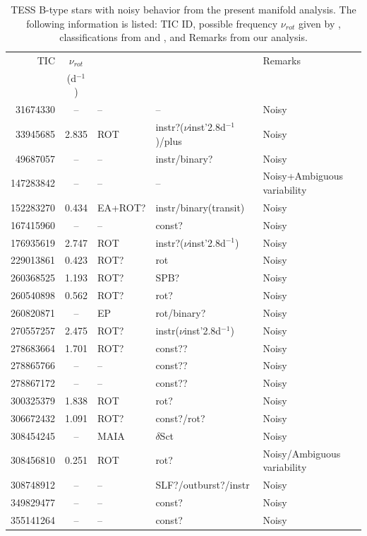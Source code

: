 \documentclass[RNAAS]{aastex63}
\begin{document}
\begin{table}[h]
    \centering
   \caption{\label{TABLE 3} TESS B-type stars with noisy behavior from the present manifold analysis. The following information is listed: TIC ID, possible frequency $\nu_{rot}$ given by \citet{Balona2019}, classifications from \citet{Balona2019} and \citet{Pedersen2019}, and Remarks from our analysis.}
    \begin{tabular}{rclll}
        \hline \hline
TIC	&	$\nu_{rot}$	&\cite{Balona2019} &	\citet{Pedersen2019}&	Remarks	\\
	&	(d$^{-1}$)	&	&	&		\\
\hline							
31674330	&	--	&  -- &	--	&	Noisy	\\
33945685	&	2.835	& ROT&	instr?($\nu$inst'2.8d$^{-1}$)/plus	&	Noisy	\\
49687057	&	--	&  -- &	instr/binary?	&	Noisy	\\
147283842	&	--	&  -- &	--	&	Noisy+Ambiguous variability	\\
152283270	&	0.434	& EA+ROT?&	instr/binary(transit)	&	Noisy	\\
167415960	&	--	&  -- &	const?	&		Noisy\\
176935619	&	2.747	& ROT&	instr?($\nu$inst'2.8d$^{-1}$)	&		Noisy\\
229013861	&	0.423	& ROT?&	rot	&	Noisy	\\
260368525	&	1.193	& ROT?&	SPB?	&	Noisy	\\
260540898	&	0.562	& ROT?&	rot?	&	Noisy	\\
260820871	&	--	& EP&	rot/binary?	&	Noisy	\\
270557257	&	2.475	& ROT?&	instr($\nu$inst'2.8d$^{-1}$)	&	Noisy	\\
278683664	&	1.701	& ROT?&	const??	&	Noisy	\\
278865766	&	--	&  -- &	const??	&	Noisy	\\
278867172	&	--	&  -- &	const??	&		Noisy\\
300325379	&	1.838	& ROT&	rot?	&		Noisy\\
306672432	&	1.091&	ROT?&	const?/rot?	&	Noisy	\\
308454245	&	--	& MAIA&	$\delta$Sct	&	Noisy	\\
308456810	&	0.251	& ROT&	rot?	&	Noisy/Ambiguous variability	\\
308748912	&	--	&  -- &	SLF?/outburst?/instr	&		Noisy\\
349829477	&	--	&  -- &	const?	&	Noisy	\\
355141264	&	--	&  -- 	&const?	&	Noisy	\\

\end{tabular}
\end{table}
\end{document}
